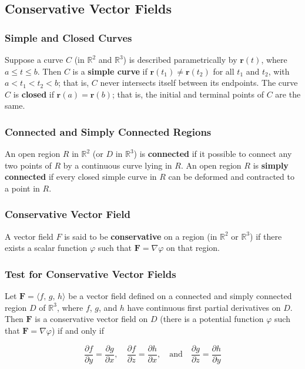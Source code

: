 \subsection{Conservative Vector Fields}

\subsubsection{Simple and Closed Curves}
Suppose a curve $C$ (in $\mathbb{R}^2$ and $\mathbb{R}^3$) is described parametrically by $\mathbf{r}(t)$, where $a \leq t \leq b$. Then $C$ is a \textbf{simple curve} if $\mathbf{r}(t_1) \neq \mathbf{r}(t_2)$ for all $t_1$ and $t_2$, with $a < t_1 < t_2 < b$; that is, $C$ never intersects itself between its endpoints. The curve $C$ is \textbf{closed} if $\mathbf{r}(a) = \mathbf{r}(b)$; that is, the initial and terminal points of $C$ are the same.

\subsubsection{Connected and Simply Connected Regions}
An open region $R$ in $\mathbb{R}^2$ (or $D$ in $\mathbb{R}^3$) is \textbf{connected} if it possible to connect any two points of $R$ by a continuous curve lying in $R$. An open region $R$ is \textbf{simply connected} if every closed simple curve in $R$ can be deformed and contracted to a point in $R$.

\subsubsection{Conservative Vector Field}
A vector field $F$ is said to be \textbf{conservative} on a region (in $\mathbb{R}^2$ or $\mathbb{R}^3$) if there exists a scalar function $\varphi$ such that $\mathbf{F} = \nabla \varphi$ on that region.

\subsubsection{Test for Conservative Vector Fields}
Let $\mathbf{F} = \langle f,\, g,\, h \rangle$ be a vector field defined on a connected and simply connected region $D$ of $\mathbb{R}^3$, where $f$, $g$, and $h$ have continuous first partial derivatives on $D$. Then $\mathbf{F}$ is a conservative vector field on $D$ (there is a potential function $\varphi$ such that $\mathbf{F} = \nabla \varphi$) if and only if

\begin{equation}
    \frac{\partial f}{\partial y} = \frac{\partial g}{\partial x}, \quad \frac{\partial f}{\partial z} = \frac{\partial h}{\partial x}, \quad\text{and}\quad \frac{\partial g}{\partial z} = \frac{\partial h}{\partial y}
\end{equation}

